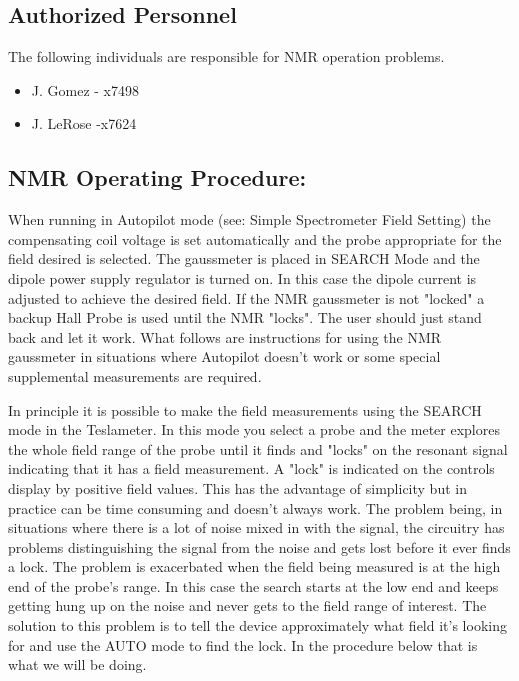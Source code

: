 {\subsection{Authorized Personnel}
The following individuals are responsible for NMR operation problems.

\begin{itemize} 
\item[~]J. Gomez - x7498 
\item[~]J. LeRose -x7624
\end{itemize} 

\subsection{NMR Operating Procedure:}

When running in Autopilot mode (see: Simple Spectrometer Field Setting) the 
compensating coil voltage is set automatically and the probe appropriate for 
the field desired is selected. The gaussmeter is placed in SEARCH Mode and the 
dipole power supply regulator is turned on. In this case the dipole current is 
adjusted to achieve the desired field. If the NMR gaussmeter is not "locked" a 
backup Hall Probe is used until the NMR "locks".  The user should just stand 
back and let it work. What follows are instructions for using
the NMR gaussmeter in situations where Autopilot doesn't work or
some special supplemental measurements are required. 

 In principle it is possible to make the field measurements using the 
SEARCH mode in the Teslameter.  In this mode you select a probe and the 
meter explores the whole field range of the probe until it finds and 
"locks" on the resonant signal indicating that it has a field 
measurement.  A "lock" is indicated on the controls display by positive 
field values.  This has the advantage of simplicity but in practice can 
be time consuming and doesn't always work.  The problem being, in 
situations where there is a lot of noise mixed in with the signal, the 
circuitry has problems distinguishing the signal from the noise and gets 
lost before it ever finds a lock.  The problem is exacerbated when the 
field being measured is at the high end of the probe's range.  In this 
case the search starts at the low end and keeps getting hung up on the 
noise and never gets to the field range of interest.  The solution to 
this problem is to tell the device approximately what field it's looking 
for and use the AUTO mode to find the lock.  In the procedure below that 
is what we will be doing.

}

